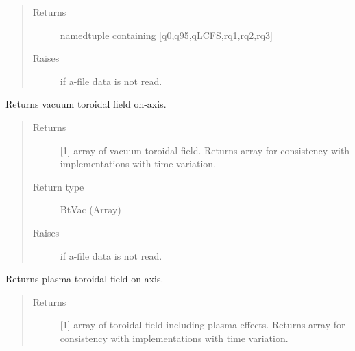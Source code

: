 \documentclass[letterpaper,10pt,english]{sphinxmanual}
\begin{document}
\begin{fulllineitems}
\begin{fulllineitems}
\begin{quote}
\begin{description}
\item[{Returns}] \leavevmode
namedtuple containing {[}q0,q95,qLCFS,rq1,rq2,rq3{]}

\item[{Raises}] \leavevmode
{} \textendash{} if a-file data is not read.

\end{description}\end{quote}

\end{fulllineitems}


\begin{fulllineitems}
\label{\detokenize{eqtools:eqtools.eqdskreader.EqdskReader.getBtVac}}
Returns vacuum toroidal field on-axis.
\begin{quote}\begin{description}
\item[{Returns}] \leavevmode
{[}1{]} array of vacuum toroidal field.  Returns array
for consistency with
{\hyperref[\detokenize{eqtools:eqtools.core.Equilibrium}]{}}
implementations with time variation.

\item[{Return type}] \leavevmode
BtVac (Array)

\item[{Raises}] \leavevmode
{} \textendash{} if a-file data is not read.

\end{description}\end{quote}

\end{fulllineitems}


\begin{fulllineitems}
\label{\detokenize{eqtools:eqtools.eqdskreader.EqdskReader.getBtPla}}
Returns plasma toroidal field on-axis.
\begin{quote}\begin{description}
\item[{Returns}] \leavevmode
{[}1{]} array of toroidal field including plasma effects.
Returns array for consistency with
{\hyperref[\detokenize{eqtools:eqtools.core.Equilibrium}]{}}
implementations with time variation.


\end{description}
\end{quote}
\end{fulllineitems}
\end{fulllineitems}
\end{document}
